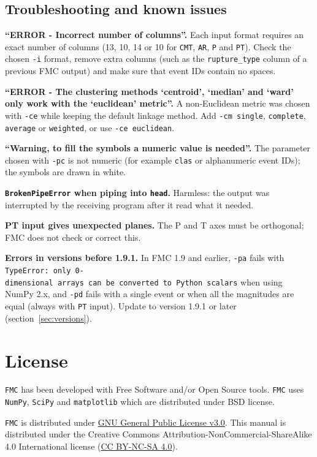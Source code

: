 \documentclass[11pt,a4paper,english]{article}
\numberwithin{equation}{section}
\begin{document}
\subsection{Troubleshooting and known issues}
\label{sec:troubleshooting-and-known-issues}

\textbf{``ERROR - Incorrect number of columns''.} Each input format requires an exact number of
columns (13, 10, 14 or 10 for \texttt{CMT}, \texttt{AR}, \texttt{P} and \texttt{PT}). Check the
chosen \texttt{-i} format, remove extra columns (such as the \texttt{rupture\_type} column of a
previous FMC output) and make sure that event IDs contain no spaces.

\textbf{``ERROR - The clustering methods `centroid', `median' and `ward' only work with the
`euclidean' metric''.} A non-Euclidean metric was chosen with \texttt{-ce} while keeping the default
linkage method. Add \texttt{-cm\ single}, \texttt{complete}, \texttt{average} or \texttt{weighted},
or use \texttt{-ce\ euclidean}.

\textbf{``Warning, to fill the symbols a numeric value is needed''.} The parameter chosen with
\texttt{-pc} is not numeric (for example \texttt{clas} or alphanumeric event IDs); the symbols are
drawn in white.

\textbf{\texttt{BrokenPipeError} when piping into \texttt{head}.} Harmless: the output was
interrupted by the receiving program after it read what it needed.

\textbf{PT input gives unexpected planes.} The P and T axes must be orthogonal; FMC does not check
or correct this.

\textbf{Errors in versions before 1.9.1.} In FMC 1.9 and earlier, \texttt{-pa} fails with
\texttt{TypeError:\ only\ 0-dimensional\ arrays\ can\ be\ converted\ to\ Python\ scalars} when using
NumPy 2.x, and \texttt{-pd} fails with a single event or when all the magnitudes are equal (always
with \texttt{PT} input). Update to version 1.9.1 or later (section~\ref{sec:versions}).

\section{License}

\texttt{FMC} has been developed with Free Software and/or Open Source
tools. \texttt{FMC} uses \texttt{NumPy}, \texttt{SciPy} and \texttt{matplotlib} which
are distributed under BSD license.

\texttt{FMC} is distributed under \href{https://www.gnu.org/licenses/gpl-3.0.html}{GNU General Public License v3.0}. This manual is distributed under the Creative Commons Attribution-NonCommercial-ShareAlike 4.0 International license (\href{https://creativecommons.org/licenses/by-nc-sa/4.0/legalcode}{CC BY-NC-SA 4.0}).
\end{document}

